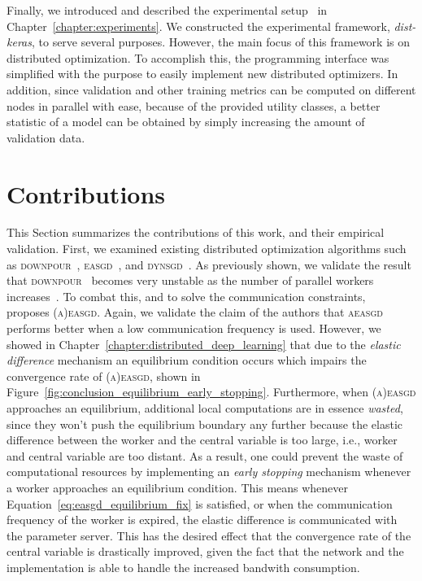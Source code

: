 Finally, we introduced and described the experimental setup~\cite{dist_keras} in Chapter~\ref{chapter:experiments}. We constructed the experimental framework, \emph{dist-keras}, to serve several purposes. However, the main focus of this framework is on distributed optimization. To accomplish this, the programming interface was simplified with the purpose to easily implement new distributed optimizers. In addition, since validation and other training metrics can be computed on different nodes in parallel with ease, because of the provided utility classes, a better statistic of a model can be obtained by simply increasing the amount of validation data.

\section{Contributions}
\label{sec:conclusion_contributions}

This Section summarizes the contributions of this work, and their empirical validation. First, we examined existing distributed optimization algorithms such as \textsc{downpour}~\cite{dean2012large}, \textsc{easgd}~\cite{zhang2015deep}, and \textsc{dynsgd}~\cite{jiang2017heterogeneity}. As previously shown, we validate the result that \textsc{downpour}~\cite{dean2012large} becomes very unstable as the number of parallel workers increases~\cite{implicitmomentum, hadjis2016omnivore}. To combat this, and to solve the communication constraints,~\cite{zhang2015deep} proposes \textsc{(a)easgd}. Again, we validate the claim of the authors that \textsc{aeasgd} performs better when a low communication frequency is used. However, we showed in Chapter~\ref{chapter:distributed_deep_learning} that due to the \emph{elastic difference} mechanism an equilibrium condition occurs which impairs the convergence rate of \textsc{(a)easgd}, shown in Figure~\ref{fig:conclusion_equilibrium_early_stopping}. Furthermore, when \textsc{(a)easgd} approaches an equilibrium, additional local computations are in essence \emph{wasted}, since they won't push the equilibrium boundary any further because the elastic difference between the worker and the central variable is too large, i.e., worker and central variable are too distant. As a result, one could prevent the waste of computational resources by implementing an \emph{early stopping} mechanism whenever a worker approaches an equilibrium condition. This means whenever Equation~\ref{eq:easgd_equilibrium_fix} is satisfied, or when the communication frequency of the worker is expired, the elastic difference is communicated with the parameter server. This has the desired effect that the convergence rate of the central variable is drastically improved, given the fact that the network and the implementation is able to handle the increased bandwith consumption.

